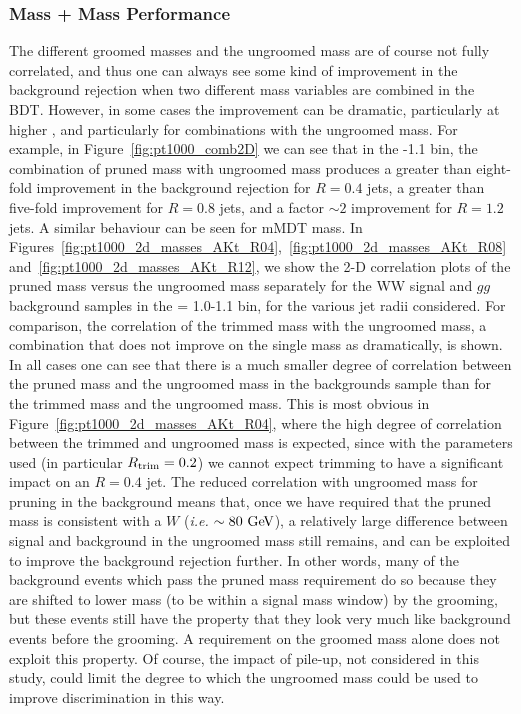 \subsubsection{Mass + Mass Performance}

The different groomed masses and the ungroomed mass are of course not
fully correlated, and thus one can always see some kind of improvement
in the background rejection when two different mass variables are combined
in the BDT. However, in some cases the improvement can be dramatic,
particularly at higher \pt, and particularly for combinations with the
ungroomed mass. For example, in Figure~\ref{fig:pt1000_comb2D} we can
see that in the -1.1 \TeV bin, the combination of pruned mass with
ungroomed mass produces a greater than eight-fold improvement in the
background rejection for $R=0.4$ jets, a greater than five-fold
improvement for $R=0.8$ jets, and a factor $\sim 2$ improvement for
$R=1.2$ jets. A similar behaviour can be seen for mMDT mass. 
In Figures~\ref{fig:pt1000_2d_masses_AKt_R04},~\ref{fig:pt1000_2d_masses_AKt_R08}
and~\ref{fig:pt1000_2d_masses_AKt_R12}, we show the 2-D correlation plots of the pruned mass versus the
ungroomed mass separately for the WW signal and $gg$ background
samples in the \pt = 1.0-1.1 \TeV bin, for the various jet radii
considered. For comparison, the correlation of the trimmed mass with
the ungroomed mass, a combination that does not improve on the single
mass as dramatically, is shown. In all cases one can see that there is
a much smaller degree of correlation between the pruned mass and the
ungroomed mass in the backgrounds sample than for the trimmed mass and the ungroomed mass. This
is most obvious in Figure~\ref{fig:pt1000_2d_masses_AKt_R04}, where
the high degree of correlation between the trimmed and ungroomed mass
is expected, since with the parameters used (in particular
$R_{\rm trim} = 0.2$) we cannot expect trimming to have a significant
impact on an $R=0.4$ jet. The reduced correlation with ungroomed mass
for pruning in the background means that, once we have required that the
pruned mass is consistent with a $W$ (\emph{i.e.} $\sim 80 \GeV$), a relatively large difference
between signal and background in the ungroomed mass still remains, and
can be exploited to improve the background rejection further. In other
words, many of the background events which pass the pruned mass
requirement do so because they are shifted to lower mass (to be within
a signal mass window) by the grooming, but these events still have the
property that they look very much like background events before the
grooming. A  requirement on the groomed mass alone does not
exploit this property. Of course, the impact of pile-up, not considered in this
study, could limit the degree to which the ungroomed
mass could be used to improve discrimination in this way. 

